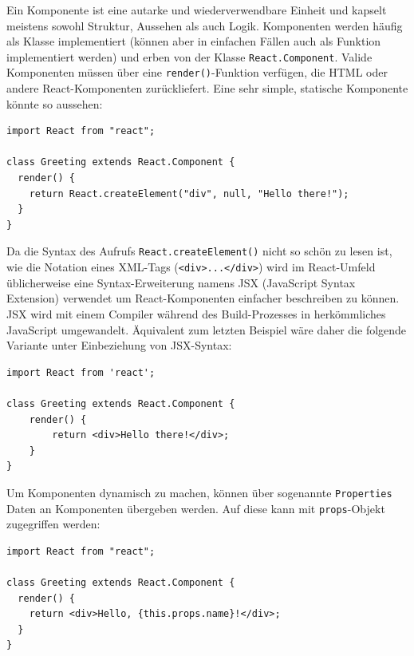 Ein Komponente ist eine autarke und wiederverwendbare Einheit und kapselt meistens sowohl Struktur, Aussehen als auch Logik. Komponenten werden häufig als Klasse implementiert (können aber in einfachen Fällen auch als Funktion implementiert werden) und erben von der Klasse \texttt{React.Component}. Valide Komponenten müssen über eine \texttt{render()}-Funktion verfügen, die HTML oder andere React-Komponenten zurückliefert. Eine sehr simple, statische Komponente könnte so aussehen:

\begin{minipage}{\linewidth}
\begin{lstlisting}[caption={Einfache React-Komponente ohne JSX-Syntax.}]
import React from "react";

class Greeting extends React.Component {
  render() {
    return React.createElement("div", null, "Hello there!");
  }
}
\end{lstlisting}
\end{minipage}

Da die Syntax des Aufrufs \texttt{React.createElement()} nicht so schön zu lesen ist, wie die Notation eines XML-Tags (\texttt{<div>...</div>}) wird im React-Umfeld üblicherweise eine Syntax-Erweiterung namens JSX (JavaScript Syntax Extension) verwendet um React-Komponenten einfacher beschreiben zu können. JSX wird mit einem Compiler während des Build-Prozesses in herkömmliches JavaScript umgewandelt. Äquivalent zum letzten Beispiel wäre daher die folgende Variante unter Einbeziehung von JSX-Syntax:

\begin{minipage}{\linewidth}
\begin{lstlisting}[caption={Einfache React-Komponente mit JSX-Syntax.}]
import React from 'react';

class Greeting extends React.Component {
    render() {
        return <div>Hello there!</div>;
    }
}
\end{lstlisting}
\end{minipage}

Um Komponenten dynamisch zu machen, können über sogenannte \texttt{Properties} Daten an Komponenten übergeben werden. Auf diese kann mit \texttt{props}-Objekt zugegriffen werden:

\begin{minipage}{\linewidth}
\begin{lstlisting}[caption={Komponenten erhalten Daten über ihre Properties.}]
import React from "react";

class Greeting extends React.Component {
  render() {
    return <div>Hello, {this.props.name}!</div>;
  }
}
\end{lstlisting}
\end{minipage}

